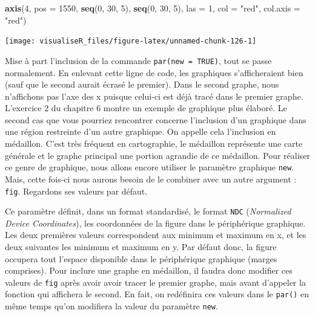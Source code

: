 \documentclass[]{article}
\newenvironment{Shaded}{\begin{snugshade}}{\end{snugshade}}
\newcommand{\CommentTok}[1]{\textcolor[rgb]{0.56,0.35,0.01}{\textit{#1}}}
\newcommand{\DataTypeTok}[1]{\textcolor[rgb]{0.13,0.29,0.53}{#1}}
\newcommand{\DecValTok}[1]{\textcolor[rgb]{0.00,0.00,0.81}{#1}}
\newcommand{\KeywordTok}[1]{\textcolor[rgb]{0.13,0.29,0.53}{\textbf{#1}}}
\newcommand{\NormalTok}[1]{#1}
\newcommand{\OperatorTok}[1]{\textcolor[rgb]{0.81,0.36,0.00}{\textbf{#1}}}
\newcommand{\StringTok}[1]{\textcolor[rgb]{0.31,0.60,0.02}{#1}}
\begin{document}
\begin{Shaded}
\begin{Highlighting}[]
\KeywordTok{axis}\NormalTok{(}\DecValTok{4}\NormalTok{, }\DataTypeTok{pos =} \DecValTok{1550}\NormalTok{, }\KeywordTok{seq}\NormalTok{(}\DecValTok{0}\NormalTok{, }\DecValTok{30}\NormalTok{, }\DecValTok{5}\NormalTok{), }\KeywordTok{seq}\NormalTok{(}\DecValTok{0}\NormalTok{, }\DecValTok{30}\NormalTok{, }\DecValTok{5}\NormalTok{), }\DataTypeTok{las =} \DecValTok{1}\NormalTok{, }\DataTypeTok{col =} \StringTok{"red"}\NormalTok{, }\DataTypeTok{col.axis =} \StringTok{"red"}\NormalTok{)}
\end{Highlighting}
\end{Shaded}

\begin{center}\texttt{[image: visualiseR\_files/figure-latex/unnamed-chunk-126-1]} \end{center}

Mise à part l'inclusion de la commande \texttt{par(new\ =\ TRUE)}, tout se passe
normalement. En enlevant cette ligne de code, les graphiques s'afficheraient
bien (sauf que le second aurait écrasé le premier). Dans le second graphe, nous
n'affichons pas l'axe des x puisque celui-ci est déjà tracé dans le premier
graphe. L'exercice 2 du chapitre 6 montre un exemple de graphique plus élaboré.
Le second cas que vous pourriez rencontrer concerne l'inclusion d'un graphique
dans une région restreinte d'un autre graphique. On appelle cela l'inclusion en
médaillon. C'est très fréquent en cartographie, le médaillon représente une
carte générale et le graphe principal une portion agrandie de ce médaillon. Pour
réaliser ce genre de graphique, nous allons encore utiliser le paramètre
graphique \texttt{new}. Mais, cette fois-ci nous aurons besoin de le combiner avec un
autre argument : \texttt{fig}. Regardons ses valeurs par défaut.

\begin{Shaded}
\end{Shaded}

Ce paramètre définit, dans un format standardisé, le format \texttt{NDC} (\emph{Normalized
Device Coordinates}), les coordonnées de la figure dans le périphérique
graphique. Les deux premières valeurs correspondent aux minimum et maximum en x,
et les deux suivantes les minimum et maximum en y. Par défaut donc, la figure
occupera tout l'espace disponible dans le périphérique graphique (marges
comprises). Pour inclure une graphe en médaillon, il faudra donc modifier ces
valeurs de \texttt{fig} après avoir avoir tracer le premier graphe, mais avant
d'appeler la fonction qui affichera le second. En fait, on redéfinira ces
valeurs dans le \texttt{par()} en même temps qu'on modifiera la valeur du paramètre
\texttt{new}.
\end{document}
